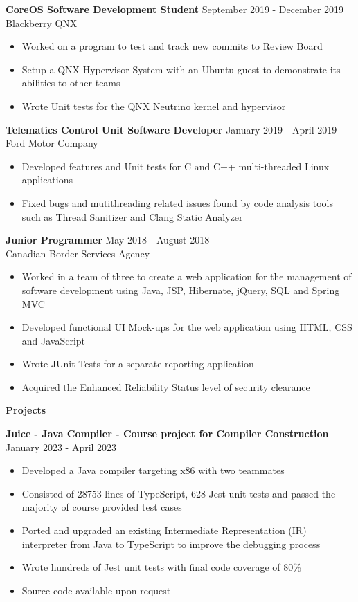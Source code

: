 \documentclass[10pt]{article}
\begin{document}
\textbf{CoreOS Software Development Student} \hfill September 2019 - December 2019 \\
Blackberry QNX
\begin{itemize}[noitemsep]
    \item Worked on a program to test and track new commits to Review Board
    \item Setup a QNX Hypervisor System with an Ubuntu guest to demonstrate its abilities to other teams
    \item Wrote Unit tests for the QNX Neutrino kernel and hypervisor
\end{itemize}

\textbf{Telematics Control Unit Software Developer}
\hfill January 2019 - April 2019 \\ Ford Motor Company
\begin{itemize}[noitemsep]
    \item Developed features and Unit tests for C and C++ multi-threaded Linux applications
    \item Fixed bugs and mutithreading related issues found by code analysis tools such as Thread Sanitizer and Clang Static Analyzer
\end{itemize}

\textbf{Junior Programmer}
\hfill May 2018 - August 2018 \\ Canadian Border Services Agency
\begin{itemize}[noitemsep]
    \item Worked in a team of three to create a web application for the management of software development using Java, JSP, Hibernate, jQuery, SQL and Spring MVC
    \item Developed functional UI Mock-ups for the web application using HTML, CSS and JavaScript
    \item Wrote JUnit Tests for a separate reporting application
    \item Acquired the Enhanced Reliability Status level of security clearance
\end{itemize}

\newpage

{\Large\textbf{Projects}}\space \hrulefill

\textbf{Juice - Java Compiler - Course project for Compiler Construction} \hfill January 2023 - April 2023
\begin{itemize}[noitemsep]
    \item Developed a Java compiler targeting x86 with two teammates
    \item Consisted of 28753 lines of TypeScript, 628 Jest unit tests and passed the majority of course provided test cases
    \item Ported and upgraded an existing Intermediate Representation (IR) interpreter from Java to TypeScript to improve the debugging process
    \item Wrote hundreds of Jest unit tests with final code coverage of 80\%
    \item Source code available upon request
\end{itemize}
\end{document}
